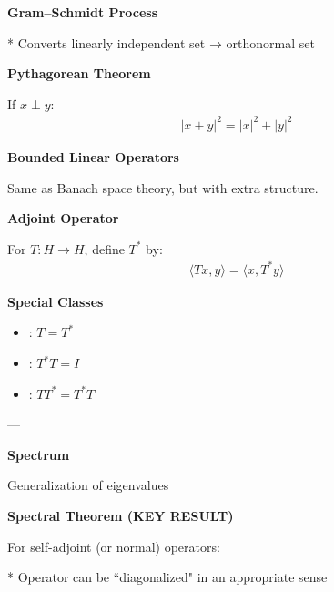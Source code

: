 \documentclass[12pt,a4paper]{report}
\begin{document}
\begin{description}
\begin{description}
    \item \textbf{Gram–Schmidt Process}

* Converts linearly independent set → orthonormal set

    \item \textbf{Pythagorean Theorem}

If $x \perp y$:
\begin{align*}
|x+y|^2 = |x|^2 + |y|^2
\end{align*}
\end{description}

\item {}

\begin{description}
    \item \textbf{Bounded Linear Operators}

Same as Banach space theory, but with extra structure.

    \item \textbf{Adjoint Operator}

For $T:H\to H$, define $T^*$ by:
\begin{align*}
\langle Tx,y\rangle = \langle x,T^*y\rangle
\end{align*}

    \item \textbf{Special Classes}

\begin{itemize}
\item {}: $T = T^*$
\item {}: $T^*T = I$
\item {}: $TT^* = T^*T$
\end{itemize}

---
\end{description}

\item {}

\begin{description}
    \item \textbf{Spectrum}

Generalization of eigenvalues

    \item \textbf{Spectral Theorem (KEY RESULT)}

For self-adjoint (or normal) operators:

* Operator can be ``diagonalized" in an appropriate sense


\end{description}
\end{description}
\end{document}
